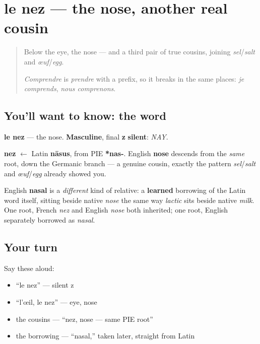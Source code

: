 \section[le nez]{le nez — the nose, another real cousin}

\label{lesson:FR-C31-nez}



\begin{quote}
Below the eye, the nose — and a third pair of true cousins, joining \emph{sel}/\emph{salt} and \emph{œuf}/\emph{egg}.

\emph{Comprendre} is \emph{prendre} with a prefix, so it breaks in the same places: \emph{je comprends}, \emph{nous comprenons}.
\end{quote}

\subsection*{You'll want to know: the word}
\textbf{le nez} — the nose. \textbf{Masculine}, final \textbf{z} \textbf{silent}: \emph{NAY}.

\begin{cousinweb}
\textbf{nez} $\leftarrow$ Latin \textbf{nāsus}, from PIE \textbf{*nas-}. English \textbf{nose} descends from the \emph{same} root, down the Germanic branch — a genuine cousin, exactly the pattern \emph{sel}/\emph{salt} and \emph{œuf}/\emph{egg} already showed you.

English \textbf{nasal} is a \emph{different} kind of relative: a \textbf{learned} borrowing of the Latin word itself, sitting beside native \emph{nose} the same way \emph{lactic} sits beside native \emph{milk}. One root, French \emph{nez} and English \emph{nose} both inherited; one root, English separately borrowed as \emph{nasal}.
\end{cousinweb}

\subsection*{Your turn}
Say these aloud:

\begin{itemize}
\raggedright
  \item \textquotedblleft{}le nez\textquotedblright{} — silent z
  \item \textquotedblleft{}l'œil, le nez\textquotedblright{} — eye, nose
  \item the cousins — \textquotedblleft{}nez, nose — same PIE root\textquotedblright{}
  \item the borrowing — \textquotedblleft{}nasal,\textquotedblright{} taken later, straight from Latin
\end{itemize}


